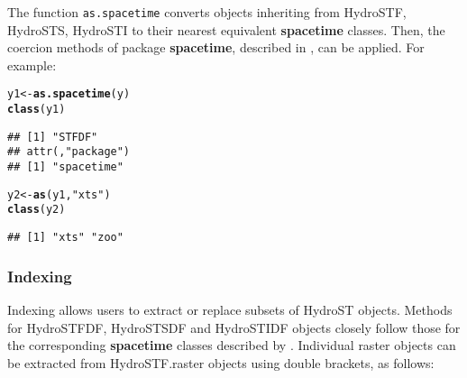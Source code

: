 \documentclass{icldt}\usepackage[]{graphicx}\usepackage[]{color}
\makeatletter
\newcommand{\hlstr}[1]{\textcolor[rgb]{0.192,0.494,0.8}{#1}}%
\newcommand{\hlstd}[1]{\textcolor[rgb]{0.345,0.345,0.345}{#1}}%
\newcommand{\hlkwb}[1]{\textcolor[rgb]{0.69,0.353,0.396}{#1}}%
\newcommand{\hlkwd}[1]{\textcolor[rgb]{0.737,0.353,0.396}{\textbf{#1}}}%
\newenvironment{kframe}{%
 \def\at@end@of@kframe{}%
 \ifinner\ifhmode%
  \def\at@end@of@kframe{\end{minipage}}%
  \begin{minipage}{\columnwidth}%
 \fi\fi%
 \def\FrameCommand##1{\hskip\@totalleftmargin \hskip-\fboxsep
 \colorbox{shadecolor}{##1}\hskip-\fboxsep
     \hskip-\linewidth \hskip-\@totalleftmargin \hskip\columnwidth}%
 \MakeFramed {\advance\hsize-\width
   \@totalleftmargin\z@ \linewidth\hsize
   \@setminipage}}%
 {\par\unskip\endMakeFramed%
 \at@end@of@kframe}
\newenvironment{knitrout}{}{} %
\makeatother
\begin{document}
\noindent The function \texttt{as.spacetime} converts objects inheriting from HydroSTF, HydroSTS, HydroSTI to their nearest equivalent \textbf{spacetime} classes. Then, the coercion methods of package \textbf{spacetime}, described in \citet{pebesma2012}, can be applied. For example:

\begin{knitrout}
\color{fgcolor}\begin{kframe}
\begin{alltt}
\hlstd{y1} \hlkwb{<-} \hlkwd{as.spacetime}\hlstd{(y)}
\hlkwd{class}\hlstd{(y1)}
\end{alltt}
\begin{verbatim}
## [1] "STFDF"
## attr(,"package")
## [1] "spacetime"
\end{verbatim}
\begin{alltt}
\hlstd{y2} \hlkwb{<-} \hlkwd{as}\hlstd{(y1,} \hlstr{"xts"}\hlstd{)}
\hlkwd{class}\hlstd{(y2)}
\end{alltt}
\begin{verbatim}
## [1] "xts" "zoo"
\end{verbatim}
\end{kframe}
\end{knitrout}

\subsubsection{Indexing}
Indexing allows users to extract or replace subsets of HydroST objects. Methods for HydroSTFDF, HydroSTSDF and HydroSTIDF objects closely follow those for the corresponding \textbf{spacetime} classes described by \citet{pebesma2012}. Individual raster objects can be extracted from HydroSTF.raster objects using double brackets, as follows:
\end{document}
